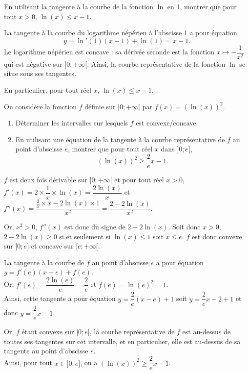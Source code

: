 \documentclass[11pt,fleqn, openany]{book} %
\begin{document}
\begin{exercise}En utilisant la tangente à la courbe de la fonction $\ln$ en 1, montrer que pour tout $x>0$, $\ln(x) \leqslant x -1$.\end{exercise}

\begin{solution}
La tangente à la courbe du logarithme népérien à l'abscisse 1 a pour équation
\[ y =\ln'(1)(x-1)+\ln(1)=x-1.\]
Le logarithme népérien est concave : sa dérivée seconde est la fonction \(x\mapsto -\dfrac{1}{x^2}\) qui est négative sur \(]0;+\infty[\). Ainsi, la courbe représentative de la fonction \(\ln\) se situe sous ses tangentes.

En particulier, pour tout réel \(x\), \(\ln(x) \leqslant x-1\).\end{solution}



\begin{exercise}On considère la fonction $f$ définie sur $]0;+\infty[$ par $f(x)=(\ln(x))^2$.
\begin{enumerate}
\item Déterminer les intervalles sur lesquels $f$ est convexe/concave.
\item En utilisant une équation de la tangente à la courbe représentative de $f$ au point d'abscisse $e$, montrer que pour tout réel $x$ dans $]0;e]$,
\[(\ln(x))^2\geqslant \dfrac{2}{e}x-1.\]
\end{enumerate}\end{exercise}

\begin{solution}
$f$ est deux fois dérivable sur $]0;+\infty[$ et pour tout réel $x>0$, $f'(x)=2  \times \dfrac{1}{x} \times \ln (x)= \dfrac{2\ln(x)}{x}$ et $f''(x)=\dfrac{\frac{2}{x}\times x - 2\ln(x) \times 1}{x^2}=\dfrac{2-2\ln(x)}{x^2}$.

Or, $x^2>0$, $f''(x)$ est donc du signe de $2-2\ln(x)$. Soit donc $x>0$, $2-2\ln(x) \geqslant 0$ si et seulement si $\ln(x) \leqslant 1$ soit $x\leqslant e$. $f$ est donc convexe sur $]0;e]$ et concave sur $[e;+\infty[$.

La tangente à la courbe de $f$ au point d'abscisse $e$ a pour équation $y=f'(e)(x-e)+f(e)$. \\Or, $f'(e)=\dfrac{2\ln(e)}{e}=\dfrac{2}{e}$ et $f(e)=\ln(e)^2=1$. \\Ainsi, cette tangente a pour équation $y=\dfrac{2}{e}(x-e)+1$ soit $y=\dfrac{2}{e}x-2+1$ et donc $y=\dfrac{2}{e}x-1$. 

Or, $f$ étant convexe sur $]0;e]$, la courbe représentative de $f$ est au-dessus de toutes ses tangentes sur cet intervalle, et en particulier, elle est au-dessus de sa tangente au point d'abscisse $e$. \\ Ainsi, pour tout $x\in]0;e]$, on a $(\ln(x))^2 \geqslant \dfrac{2}{e}x-1$.\end{solution}
\end{document}
